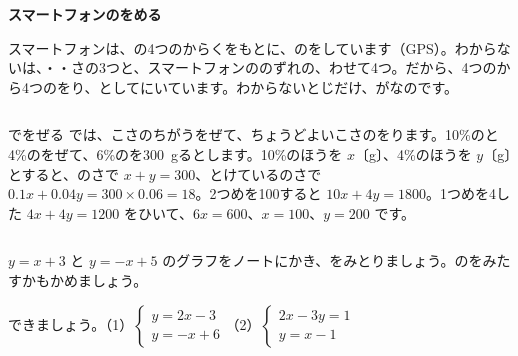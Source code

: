 \begin{butsuri}
\par\addvspace{3pt}\textbf{スマートフォンのをめる}\par\noindent
スマートフォンは、の4つのからくをもとに、のをしています（GPS）。わからないは、・・さの3つと、スマートフォンののずれの、わせて4つ。だから、4つのから4つのをり、としてにいています。わからないとじだけ、がなのです。
\end{butsuri}

\begin{column}{でをぜる}
では、こさのちがうをぜて、ちょうどよいこさのをります。10\%のと4\%のをぜて、6\%のを\qty{300}{g}るとします。10\%のほうを $x$〔g〕、4\%のほうを $y$〔g〕とすると、のさで $x+y=300$、とけているのさで $0.1x+0.04y=300\times0.06=18$。2つめを100すると $10x+4y=1800$。1つめを4した $4x+4y=1200$ をひいて、$6x=600$、$x=100$、$y=200$ です。
\end{column}



\bkendproblems
{}

\bkproblem $y=x+3$ と $y=-x+5$ のグラフをノートにかき、をみとりましょう。のをみたすかもかめましょう。

\bkproblem {}できましょう。（1）\nobreak $\begin{cases} y=2x-3\\ y=-x+6 \end{cases}$\quad（2）\nobreak $\begin{cases} 2x-3y=1\\ y=x-1 \end{cases}$

